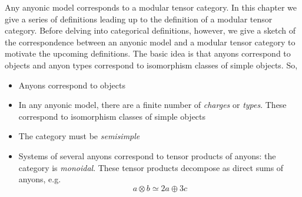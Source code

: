 Any anyonic model corresponds to a modular tensor category. In this chapter we
give a series of definitions leading up to the definition of a modular tensor
category. Before delving into categorical definitions, however, we give a
sketch of the correspondence between an anyonic model and a modular tensor
category to motivate the upcoming definitions. The basic idea is that anyons
correspond to objects and anyon types correspond to isomorphism classes of
simple objects. So,

\begin{itemize}
\item Anyons correspond to objects
\item In any anyonic model, there are a finite number of \emph{charges} or
      \emph{types}. These correspond to isomorphism classes of simple objects
\item The category must be \emph{semisimple} 
\item Systems of several anyons correspond to tensor products of anyons: the
      category is \emph{monoidal}. These tensor products decompose as direct sums of
      anyons, e.g. 
\begin{equation}
a \otimes b \simeq 2a \oplus 3c
\end{equation}


\end{itemize}
